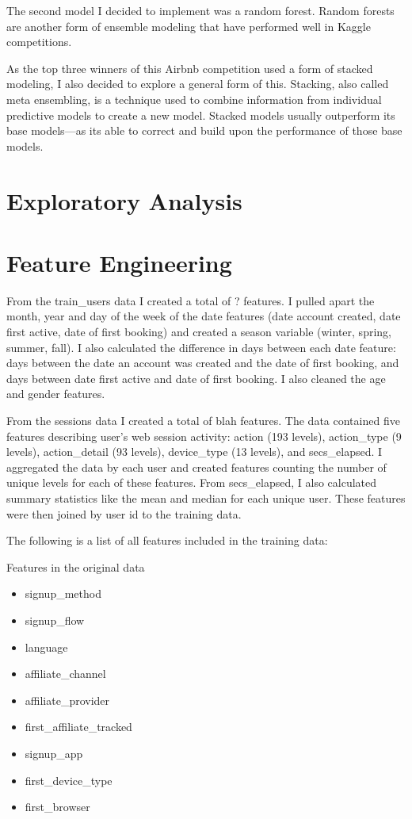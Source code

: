 \documentclass{article}
\begin{document}
The second model I decided to implement was a random forest. Random forests are another form of ensemble 
modeling that have performed well in Kaggle competitions. 

As the top three winners of this Airbnb competition used a form of stacked modeling, I also decided to 
explore a general form of this. Stacking, also called meta ensembling, is a technique used to combine 
information from individual predictive models to create a new model. Stacked models usually outperform 
its base models---as it\textquotesingle s able to correct and build upon the performance of those base models. 

\section{Exploratory Analysis}

\section{Feature Engineering}

From the train\_users data I created a total of ? features. I pulled apart the month, year and day of 
the week of the date features (date account created, date first active, date of first booking) and created 
a season variable (winter, spring, summer, fall). I also calculated the difference in days between each 
date feature:  days between the date an account was created and the date of first booking, and days 
between date first active and date of first booking. I also cleaned the age and gender features. 

From the sessions data I created a total of blah features. The data contained five features describing 
user’s web session activity: action (193 levels), action\_type (9 levels), action\_detail (93 levels), 
device\_type (13 levels), and secs\_elapsed. I aggregated the data by each user and created features 
counting the number of unique levels for each of these features. From secs\_elapsed, I also calculated 
summary statistics like the mean and median for each unique user. These features were then joined by 
user id to the training data. 

The following is a list of all features included in the training data: 

Features in the original data
\begin{itemize}
  \item signup\_method
  \item signup\_flow
  \item language
  \item affiliate\_channel 
  \item affiliate\_provider
  \item first\_affiliate\_tracked
  \item signup\_app
  \item first\_device\_type
  \item first\_browser
\end{itemize}
\end{document}
